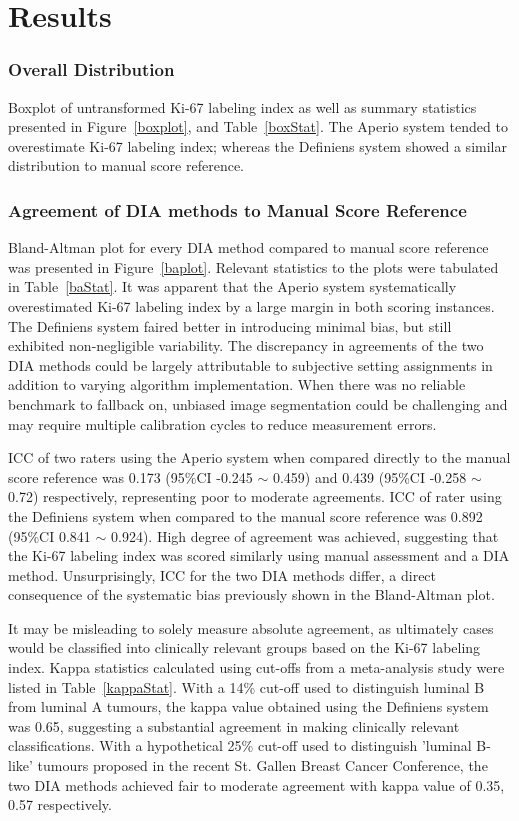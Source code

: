 \documentclass[final,3p,times]{elsarticle}
\begin{document}
\section*{Results}

\subsubsection*{Overall Distribution}
Boxplot of untransformed Ki-67 labeling index as well as summary statistics presented in Figure~\ref{boxplot}, and Table~\ref{boxStat}. The Aperio system tended to overestimate Ki-67 labeling index; whereas the Definiens system showed a similar distribution to manual score reference.

\subsubsection*{Agreement of DIA methods to Manual Score Reference}

Bland-Altman plot for every DIA method compared to manual score reference was presented in Figure~\ref{baplot}. Relevant statistics to the plots were tabulated in Table~\ref{baStat}. It was apparent that the Aperio system systematically overestimated Ki-67 labeling index by a large margin in both scoring instances. The Definiens system faired better in introducing minimal bias, but still exhibited non-negligible variability. The discrepancy in agreements of the two DIA methods could be largely attributable to subjective setting assignments in addition to varying algorithm implementation. When there was no reliable benchmark to fallback on, unbiased image segmentation could be challenging and may require multiple calibration cycles to reduce measurement errors.

ICC of two raters using the Aperio system when compared directly to the manual score reference was 0.173 (95\%CI -0.245 $\sim$ 0.459) and 0.439 (95\%CI -0.258 $\sim$  0.72) respectively, representing poor to moderate agreements. ICC of rater using the Definiens system when compared to the manual score reference was 0.892 (95\%CI 0.841 $\sim$ 0.924). High degree of agreement was achieved, suggesting that the Ki-67 labeling index was scored similarly using manual assessment and a DIA method. Unsurprisingly, ICC for the two DIA methods differ, a direct consequence of the systematic bias previously shown in the Bland-Altman plot.

It may be misleading to solely measure absolute agreement, as ultimately cases would be classified into clinically relevant groups based on the Ki-67 labeling index. Kappa statistics calculated using cut-offs from a meta-analysis study were listed in Table~\ref{kappaStat}. \cite{Petrelli2015} With a 14\% cut-off used to distinguish  luminal B from luminal A tumours, \cite{Cheang2009} the kappa value obtained using the Definiens system was 0.65, suggesting a substantial agreement in making clinically relevant classifications. \cite{Landis1977} With a hypothetical 25\% cut-off used to distinguish {'}luminal B-like{'} tumours proposed in the recent St. Gallen Breast Cancer Conference, \cite{Coates2015} the two DIA methods achieved fair to moderate agreement with kappa value of 0.35, 0.57 respectively.
\end{document}
